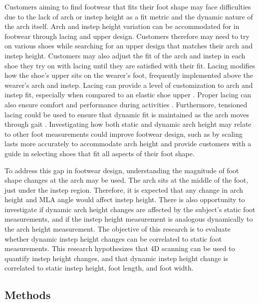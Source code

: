 \documentclass[defaultstyle,11pt]{comps}
\begin{document}
Customers aiming to find footwear that fits their foot shape may face difficulties due to the lack of arch or instep height as a fit metric and the dynamic nature of the arch itself.
Arch and instep height variation can be accommodated for in footwear through lacing and upper design.
Customers therefore may need to try on various shoes while searching for an upper design that matches their arch and instep height.
Customers may also adjust the fit of the arch and instep in each shoe they try on with lacing until they are satisfied with their fit.
Lacing modifies how the shoe's upper sits on the wearer's foot, frequently implemented above the wearer's arch and instep.
Lacing can provide a level of customization to arch and instep fit, especially when compared to an elastic shoe upper \citep{Hong2011}.
Proper lacing can also ensure comfort and performance during activities \citep{Hagen2009, Hagen2010, Pryhoda2021}.
Furthermore, tensioned lacing could be used to ensure that dynamic fit is maintained as the arch moves through gait \citep{Pryhoda2021}.
Investigating how both static and dynamic arch height may relate to other foot measurements could improve footwear design, such as by scaling lasts more accurately to accommodate arch height and provide customers with a guide in selecting shoes that fit all aspects of their foot shape.

To address this gap in footwear design, understanding the magnitude of foot shape changes at the arch may be used.
The arch sits at the middle of the foot, just under the instep region.
Therefore, it is expected that any change in arch height and MLA angle would affect instep height.
There is also opportunity to investigate if dynamic arch height changes are affected by the subject's static foot measurements, and if the instep height measurement is analogous dynamically to the arch height measurement.
The objective of this research is to evaluate whether dynamic instep height changes can be correlated to static foot measurements.
This research hypothesizes that 4D scanning can be used to quantify instep height changes, and that dynamic instep height change is correlated to static instep height, foot length, and foot width.

\hypertarget{methods-2}{%
\subsection{Methods}\label{methods-2}}
\end{document}
